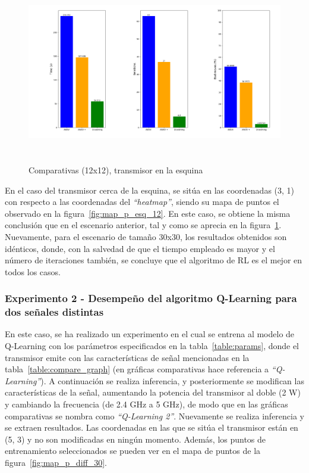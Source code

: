 \begin{figure} [tp]
    \begin{center}
    \includegraphics[height=8cm]{imagenes/cap4/20_comp_esq_12.png}
    \end{center}
    \caption[Comparativas (12x12), transmisor en la esquina]{Comparativas (12x12), transmisor en la esquina}
    \label{fig:comp_esq_12}
\end{figure}

En el caso del transmisor cerca de la esquina, se sitúa en las coordenadas (3, 1) con respecto a las coordenadas del \emph{``heatmap''}, siendo su mapa de puntos el observado en la figura~\ref{fig:map_p_esq_12}. En este caso, se obtiene la misma conclusión que en el escenario anterior, tal y como se aprecia en la figura~\ref{fig:comp_esq_12}. Nuevamente, para el escenario de tamaño 30x30, los resultados obtenidos son idénticos, donde, con la salvedad de que el tiempo empleado es mayor y el número de iteraciones también, se concluye que el algoritmo de \ac{RL} es el mejor en todos los casos.\\

\subsubsection{Experimento 2 - Desempeño del algoritmo Q-Learning para dos señales distintas}
\label{subsubsec:experimentos_1}

En este caso, se ha realizado un experimento en el cual se entrena al modelo de Q-Learning con los parámetros especificados en la tabla~\ref{table:params}, donde el transmisor emite con las características de señal mencionadas en la tabla~\ref{table:compare_graph} (en gráficas comparativas hace referencia a \emph{``Q-Learning''}). A continuación se realiza inferencia, y posteriormente se modifican las características de la señal, aumentando la potencia del transmisor al doble (2 W) y cambiando la frecuencia (de 2.4 GHz a 5 GHz), de modo que en las gráficas comparativas se nombra como \emph{``Q-Learning 2''}. Nuevamente se realiza inferencia y se extraen resultados. Las coordenadas en las que se sitúa el transmisor están en (5, 3) y no son modificadas en ningún momento. Además, los puntos de entrenamiento seleccionados se pueden ver en el mapa de puntos de la figura~\ref{fig:map_p_diff_30}.\\


